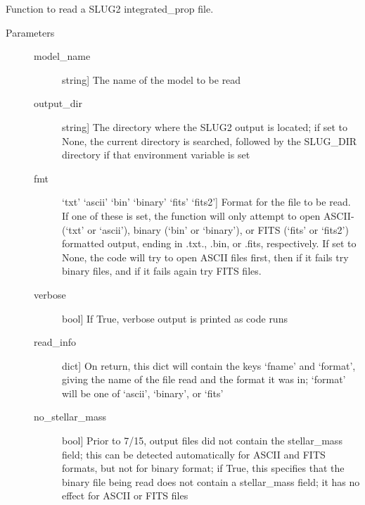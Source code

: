 \documentclass[letterpaper,10pt,english]{sphinxmanual}
\begin{document}

\begin{fulllineitems}
\label{slugpy:slugpy.read_integrated_prop}
Function to read a SLUG2 integrated\_prop file.
\begin{description}
\item[{Parameters}] \leavevmode\begin{description}
\item[{model\_name}] \leavevmode{[}string{]}
The name of the model to be read

\item[{output\_dir}] \leavevmode{[}string{]}
The directory where the SLUG2 output is located; if set to None,
the current directory is searched, followed by the SLUG\_DIR
directory if that environment variable is set

\item[{fmt}] \leavevmode{[}`txt' \textbar{} `ascii' \textbar{} `bin' \textbar{} `binary' \textbar{} `fits' \textbar{} `fits2'{]}
Format for the file to be read. If one of these is set, the
function will only attempt to open ASCII-(`txt' or `ascii'), 
binary (`bin' or `binary'), or FITS (`fits' or `fits2')
formatted output, ending in .txt., .bin, or .fits,
respectively. If set to None, the code will try to open
ASCII files first, then if it fails try binary files, and if
it fails again try FITS files.

\item[{verbose}] \leavevmode{[}bool{]}
If True, verbose output is printed as code runs

\item[{read\_info}] \leavevmode{[}dict{]}
On return, this dict will contain the keys `fname' and
`format', giving the name of the file read and the format it
was in; `format' will be one of `ascii', `binary', or `fits'

\item[{no\_stellar\_mass}] \leavevmode{[}bool{]}
Prior to 7/15, output files did not contain the stellar\_mass
field; this can be detected automatically for ASCII and FITS
formats, but not for binary format; if True, this specifies
that the binary file being read does not contain a
stellar\_mass field; it has no effect for ASCII or FITS files


\end{description}
\end{description}
\end{fulllineitems}
\end{document}
